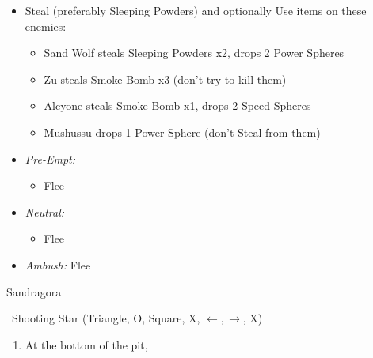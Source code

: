 \begin{encounters}
    \begin{itemize}
        \item Steal (preferably Sleeping Powders) and optionally Use items on these enemies:
        \begin{itemize}
            \item Sand Wolf steals Sleeping Powders x2, drops 2 Power Spheres
            \item Zu steals Smoke Bomb x3 (don't try to kill them)
            \item Alcyone steals Smoke Bomb x1, drops 2 Speed Spheres
            \item Mushussu drops 1 Power Sphere (don't Steal from them)
        \end{itemize}
        \item \textit{Pre-Empt:}
        \begin{itemize}
            \tidusf Defend
            \rikkuf Steal or Use a Smoke Bomb/Silence Grenade/Sleeping Powder
            \luluf Defend
            \item Flee
        \end{itemize}
        \item \textit{Neutral:}
        \begin{itemize}
            \switch{\tidus}{\kimahri}
            \kimahrif Steal
            \rikkuf Switch for \tidus\ or Use a Smoke Bomb/Silence Grenade/Sleeping Powder
            \item Flee
        \end{itemize}
        \item \textit{Ambush:} Flee
    \end{itemize}
\end{encounters}
\begin{battle}{Sandragora}
    \begin{itemize}
        \switch{\tidus}{\auron}
        \auronf \od\ Shooting Star (Triangle, O, Square, X, $\leftarrow, \rightarrow$, X)
    \end{itemize}
\end{battle}
\begin{enumerate}[resume]
    \item At the bottom of the pit, 
\end{enumerate}
\bothnpsingle
{}
